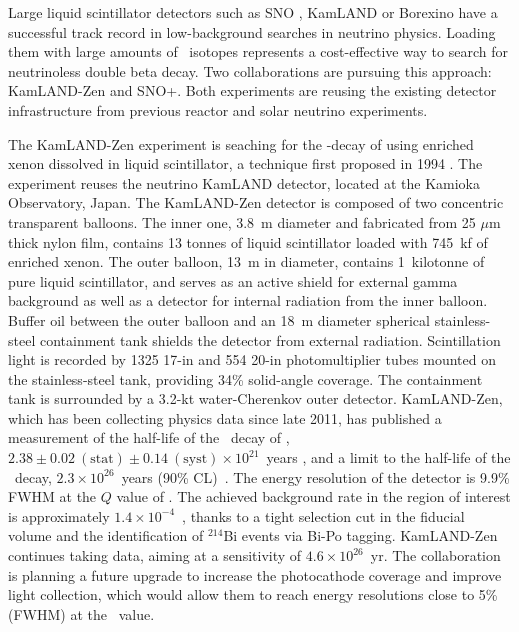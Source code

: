 %
Large liquid scintillator detectors such as SNO \cite{SNO:2002tuh}, KamLAND \cite{KamLAND:2002uet} or Borexino \cite{Borexino:2008gab} have a successful track record in low-background searches in neutrino physics. Loading them with large amounts of \bb\ isotopes represents a cost-effective way to search for neutrinoless double beta decay. Two collaborations are pursuing this approach: KamLAND-Zen and SNO+. Both experiments are reusing the existing detector infrastructure from previous reactor and solar neutrino experiments. 

The KamLAND-Zen experiment \cite{} is seaching for the \bbonu-decay of  using enriched xenon dissolved in liquid scintillator, a technique first proposed in 1994 \cite{Raghavan:1994qw}. The experiment reuses the neutrino KamLAND detector, located at the Kamioka Observatory, Japan. The KamLAND-Zen detector is composed of two concentric transparent balloons. The inner one, 3.8~m diameter and fabricated from 25 $\mu$m thick nylon film, contains 13 tonnes of liquid scintillator loaded with 745~kf of enriched xenon. The outer balloon, 13~m in diameter, contains 1~kilotonne of pure liquid scintillator, and serves as an active shield for external gamma background as well as a detector for internal radiation from the inner balloon. Buffer oil between the outer balloon and an 18~m diameter spherical stainless-steel containment tank shields the detector from external radiation. Scintillation light is recorded by 1325 17-in and 554 20-in photomultiplier tubes mounted on the stainless-steel tank, providing 34\% solid-angle coverage. The containment tank is surrounded by a 3.2-kt water-Cherenkov outer detector. KamLAND-Zen, which has been collecting physics data since late 2011, has published a measurement of the half-life of the \bbtnu\ decay of \XE, $2.38\pm0.02~(\mathrm{stat})\pm0.14~(\mathrm{syst})\times10^{21}$~years \cite{KamLANDZen:2012aa}, and a limit to the half-life of the \bbonu\ decay, $2.3\times10^{26}$~years (90\% CL)~\cite{KamLAND-Zen:2022tow,}. The energy resolution of the detector is 9.9\% FWHM at the $Q$ value of \XE. The achieved background rate in the region of interest is approximately $1.4\times10^{-4}$~\ckky, thanks to a tight selection cut in the fiducial volume and the identification of $^{214}$Bi events via Bi-Po tagging. KamLAND-Zen continues taking data, aiming at a sensitivity of $4.6\times10^{26}$~yr. The collaboration is planning a future upgrade to increase the photocathode coverage and improve light collection, which would allow them to reach energy resolutions close to 5\% (FWHM) at the \Qbb\ value. 

